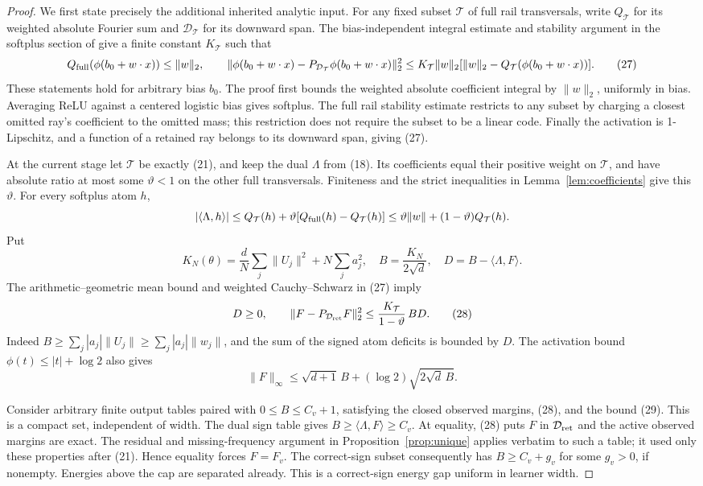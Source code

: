\documentclass[11pt]{article}
\begin{document}
\begin{proof}
We first state precisely the additional inherited analytic input.
For any fixed subset $\mathcal T$ of full rail transversals, write
$Q_{\mathcal T}$ for its weighted absolute Fourier sum and
$\mathcal D_{\mathcal T}$ for its downward span.
The bias-independent integral estimate and stability argument in the
softplus section of \cite{shared} give a finite constant $K_{\mathcal T}$
such that
\[
 Q_{\rm full}(\phi(b_0+w\cdot x))\le\|w\|_2,\qquad
 \|\phi(b_0+w\cdot x)-P_{\mathcal D_{\mathcal T}}
                     \phi(b_0+w\cdot x)\|_2^2
 \le K_{\mathcal T}\|w\|_2
            [\|w\|_2-Q_{\mathcal T}(\phi(b_0+w\cdot x))]. \tag{27}
\]
These statements hold for arbitrary bias $b_0$.
The proof first bounds the weighted absolute coefficient integral by
$\|w\|_2$, uniformly in bias. Averaging ReLU against a centered logistic
bias gives softplus. The full rail stability estimate restricts to any
subset by charging a closest omitted ray's coefficient to the omitted
mass; this restriction does not require the subset to be a linear code.
Finally the activation is 1-Lipschitz, and a function of a retained
ray belongs to its downward span, giving (27).

At the current stage let $\mathcal T$ be exactly (21), and keep the
dual $\Lambda$ from (18). Its coefficients equal their positive
weight on $\mathcal T$, and have absolute ratio at most some
$\vartheta<1$ on the other full transversals. Finiteness and the strict
inequalities in Lemma~\ref{lem:coefficients} give this $\vartheta$.
For every softplus atom $h$,
\[
 |\langle\Lambda,h\rangle|
       \le Q_{\mathcal T}(h)+\vartheta
                            [Q_{\rm full}(h)-Q_{\mathcal T}(h)]
       \le\vartheta\|w\|+(1-\vartheta)Q_{\mathcal T}(h).
\]
Put
\[
 K_N(\theta)=\frac dN\sum_j\|U_j\|^2+N\sum_j a_j^2,\quad
 B=\frac{K_N}{2\sqrt d},\quad D=B-\langle\Lambda,F\rangle.
\]
The arithmetic--geometric mean bound and weighted Cauchy--Schwarz
in (27) imply
\[
 D\ge0,\qquad
 \|F-P_{\mathcal D_{\rm ret}}F\|_2^2
                   \le\frac{K_{\mathcal T}}{1-\vartheta}\,BD. \tag{28}
\]
Indeed $B\ge\sum_j|a_j|\|U_j\|\ge\sum_j|a_j|\|w_j\|$, and the
sum of the signed atom deficits is bounded by $D$.
The activation bound $\phi(t)\le|t|+\log2$ also gives
\[
 \|F\|_\infty\le\sqrt{d+1}\,B
                       +(\log2)\sqrt{2\sqrt d\,B}.       \tag{29}
\]

Consider arbitrary finite output tables paired with $0\le B\le C_v+1$,
satisfying the closed observed margins, (28), and the bound (29).
This is a compact set, independent of width.
The dual sign table gives $B\ge\langle\Lambda,F\rangle\ge C_v$.
At equality, (28) puts $F$ in $\mathcal D_{\rm ret}$ and the active
observed margins are exact. The residual and missing-frequency argument
in Proposition~\ref{prop:unique} applies verbatim to such a table;
it used only these properties after (21). Hence equality forces $F=F_v$.
The correct-sign subset consequently has $B\ge C_v+g_v$ for some
$g_v>0$, if nonempty. Energies above the cap are separated already.
This is a correct-sign energy gap uniform in learner width.


\end{proof}
\end{document}
